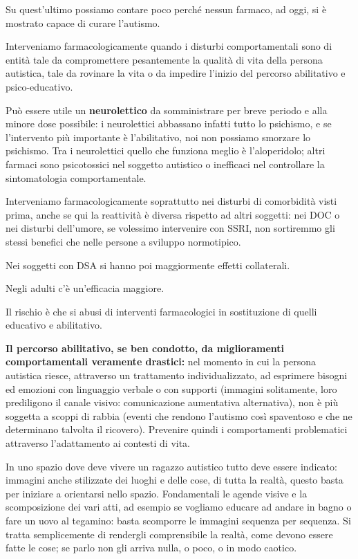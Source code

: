 \documentclass[]{article}
\begin{document}
Su quest'ultimo possiamo contare poco perché nessun farmaco, ad oggi, si
è mostrato capace di curare l'autismo.

Interveniamo farmacologicamente quando i disturbi comportamentali sono
di entità tale da compromettere pesantemente la qualità di vita della
persona autistica, tale da rovinare la vita o da impedire l'inizio del
percorso abilitativo e psico-educativo.

Può essere utile un \textbf{neurolettico} da somministrare per breve
periodo e alla minore dose possibile: i neurolettici abbassano infatti
tutto lo psichismo, e se l'intervento più importante è l'abilitativo,
noi non possiamo smorzare lo psichismo. Tra i neurolettici quello che
funziona meglio è l'aloperidolo; altri farmaci sono psicotossici nel
soggetto autistico o inefficaci nel controllare la sintomatologia
comportamentale.

Interveniamo farmacologicamente soprattutto nei disturbi di comorbidità
visti prima, anche se qui la reattività è diversa rispetto ad altri
soggetti: nei DOC o nei disturbi dell'umore, se volessimo intervenire
con SSRI, non sortiremmo gli stessi benefici che nelle persone a
sviluppo normotipico.

Nei soggetti con DSA si hanno poi maggiormente effetti collaterali.

Negli adulti c'è un'efficacia maggiore.

Il rischio è che si abusi di interventi farmacologici in sostituzione di
quelli educativo e abilitativo.

\textbf{Il percorso abilitativo, se ben condotto, da miglioramenti
comportamentali veramente drastici:} nel momento in cui la persona
autistica riesce, attraverso un trattamento individualizzato, ad
esprimere bisogni ed emozioni con linguaggio verbale o con supporti
(immagini solitamente, loro prediligono il canale visivo: comunicazione
aumentativa alternativa), non è più soggetta a scoppi di rabbia (eventi
che rendono l'autismo così spaventoso e che ne determinano talvolta il
ricovero). Prevenire quindi i comportamenti problematici attraverso
l'adattamento ai contesti di vita.

In uno spazio dove deve vivere un ragazzo autistico tutto deve essere
indicato: immagini anche stilizzate dei luoghi e delle cose, di tutta la
realtà, questo basta per iniziare a orientarsi nello spazio.
Fondamentali le agende visive e la scomposizione dei vari atti, ad
esempio se vogliamo educare ad andare in bagno o fare un uovo al
tegamino: basta scomporre le immagini sequenza per sequenza. Si tratta
semplicemente di rendergli comprensibile la realtà, come devono essere
fatte le cose; se parlo non gli arriva nulla, o poco, o in modo caotico.
\end{document}
